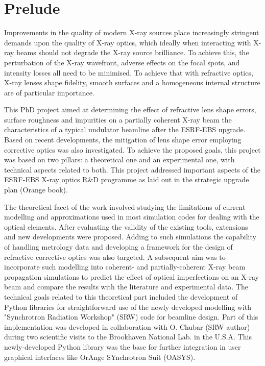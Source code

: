 
\chapter*{Prelude}

Improvements in the quality of modern X-ray sources place increasingly stringent demands upon the quality of X-ray optics, which ideally when interacting with X-ray beams should not degrade the X-ray source brilliance. To achieve this, the perturbation of the X-ray wavefront, adverse effects on the focal spots, and intensity losses all need to be minimised. To achieve that with refractive optics, X-ray lenses shape fidelity, smooth surfaces and a homogeneous internal structure are of particular importance. 

This PhD project aimed at determining the effect of refractive lens shape errors, surface roughness and impurities on a partially coherent X-ray beam the characteristics of a typical undulator beamline after the ESRF-EBS upgrade. Based on recent developments, the mitigation of lens shape error employing corrective optics was also investigated. To achieve the proposed goals, this project was based on two pillars: a theoretical one and an experimental one, with technical aspects related to both. This project addressed important aspects of the ESRF-EBS X-ray optics R$\&$D programme as laid out in the strategic upgrade plan (Orange book).

The theoretical facet of the work involved studying the limitations of current modelling and approximations used in most simulation codes for dealing with the optical elements. After evaluating the validity of the existing tools, extensions and new developments were proposed. Adding to such simulations the capability of handling metrology data and developing a framework for the design of refractive corrective optics was also targeted. A subsequent aim was to incorporate such modelling into coherent- and partially-coherent X-ray beam propagation simulations to predict the effect of optical imperfections on an X-ray beam and compare the results with the literature and experimental data. The technical goals related to this theoretical part included the development of Python libraries for straightforward use of the newly developed modelling with "Synchrotron Radiation Workshop" (SRW) code for beamline design. Part of this implementation was developed in collaboration with O. Chubar (SRW author) during two scientific visits to the Brookhaven National Lab. in the U.S.A. This newly-developed Python library was the base for further integration in user graphical interfaces like OrAnge SYnchrotron Suit (OASYS). 

